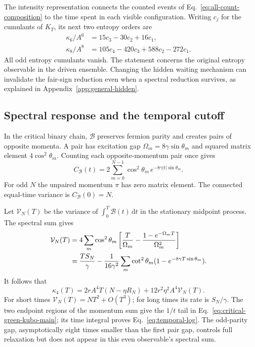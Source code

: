 \documentclass[aps,pre,reprint,amsmath,amssymb,longbibliography,floatfix]{revtex4-2}
\newcommand{\dd}{\,\mathrm d}
\begin{document}
The intensity representation connects the counted events of
Eq.~\eqref{eq:all-count-composition} to the time spent in each visible
configuration. Writing $c_j$ for the cumulants of $K_T$, its next two
entropy orders are
\begin{align}
 \kappa_6/A^6&=15c_3-30c_2+16c_1,\label{eq:count-sixth}\\
 \kappa_8/A^8&=105c_4-420c_3+588c_2-272c_1.\label{eq:count-eighth}
\end{align}
All odd entropy cumulants vanish. The statement concerns the original
entropy observable in the driven ensemble. Changing the hidden waiting
mechanism can invalidate the fair-sign reduction even when a spectral
reduction survives, as explained in Appendix~\ref{app:general-hidden}.

\subsection{Spectral response and the temporal cutoff}
In the critical binary chain, $\mathcal B$ preserves fermion parity and
creates pairs of opposite momenta. A pair has excitation gap
$\Omega_m=8\gamma\sin\theta_m$ and squared matrix element
$4\cos^2\theta_m$. Counting each opposite-momentum pair once gives
\begin{equation}
 C_{\mathcal B}(t)
 =2\sum_{m=0}^{N-1}\cos^2\theta_m\,
 e^{-8\gamma |t|\sin\theta_m}.
 \label{eq:critical-time-correlation}
\end{equation}
For odd $N$ the unpaired momentum $\pi$ has zero matrix element. The connected equal-time
variance is $C_{\mathcal B}(0)=N$.

Let $\mathcal V_N(T)$ be the variance of
$\int_0^T\mathcal B(t)\dd t$ in the stationary midpoint process. The
spectral sum gives
\begin{align}
 \mathcal V_N(T)
 &=4\sum_m\cos^2\theta_m\left[
 \frac{T}{\Omega_m}-\frac{1-e^{-\Omega_mT}}{\Omega_m^2}\right] \label{eq:finite-time-integrated-variance}
\\
 &=\frac{T S_N}{\gamma}
 -\frac1{16\gamma^2}\sum_m\cot^2\theta_m
       (1-e^{-8\gamma T\sin\theta_m}). \notag
 \end{align}
It follows that
\begin{equation}
 \kappa_4(T)=2rA^4T(N-\eta R_N)
       +12r^2\eta^2A^4\mathcal V_N(T).
 \label{eq:finite-time-fourth}
\end{equation}
For short times $\mathcal V_N(T)=NT^2+O(T^3)$; for long times its rate
is $S_N/\gamma$. The two endpoint regions of the momentum sum give
the $1/t$ tail in Eq.~\eqref{eq:critical-green-kubo-main}; its time
integral proves Eq.~\eqref{eq:temporal-log}. The odd-parity gap, asymptotically eight times smaller than the first
pair gap, controls full relaxation but does not appear in this even observable's
spectral sum.
\end{document}
